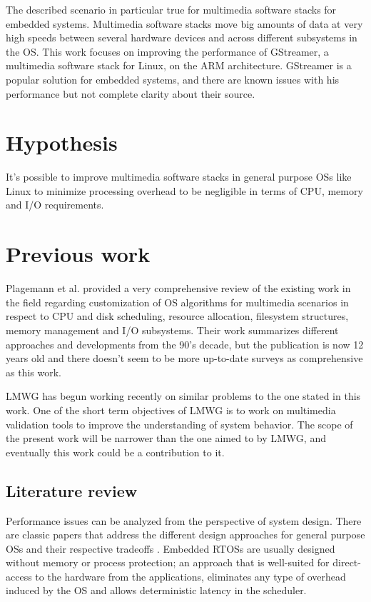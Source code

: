 The described scenario in particular true for multimedia software stacks for embedded systems. Multimedia software stacks move big amounts of data at very high speeds between several hardware devices and across different subsystems in the \ac{OS}. This work focuses on improving the performance of GStreamer, a multimedia software stack for Linux, on the \ac{ARM} architecture. GStreamer is a popular solution for embedded systems, and there are known issues with his performance but not complete clarity about their source\cite{Contreras:vn}.

\section{Hypothesis}
It's possible to improve multimedia software stacks in general purpose \aclp{OS} like Linux to minimize processing overhead to be negligible in terms of CPU, memory and I/O requirements.

\section{Previous work}
Plagemann et al.\cite{Plagemann2000267} provided a very comprehensive review of the existing work in the field regarding customization of \ac{OS} algorithms for multimedia scenarios in respect to CPU and disk scheduling, resource allocation, filesystem structures, memory management and I/O subsystems. Their work summarizes different approaches and developments from the 90's decade, but the publication is now 12 years old and there doesn't seem to be more up-to-date surveys as comprehensive as this work.

\ac{LMWG} has begun working recently on similar problems\cite{Reis:vn} to the one stated in this work. One of the short term objectives of \ac{LMWG} is to work on multimedia validation tools to improve the understanding of system behavior. The scope of the present work will be narrower than the one aimed to by \ac{LMWG}, and eventually this work could be a contribution to it.

\subsection{Literature review}
Performance issues can be analyzed from the perspective of system design. There are classic papers that address the different design approaches for general purpose \aclp{OS} and their respective tradeoffs \cite{Engler95exokernel:an}\cite{Bershad95extensibility}\citep{Liedtke:1995kx}. Embedded \acp{RTOS} are usually designed without memory or process protection; an approach that is well-suited for direct-access to the hardware from the applications, eliminates any type of overhead induced by the \ac{OS} and allows deterministic latency in the scheduler.

